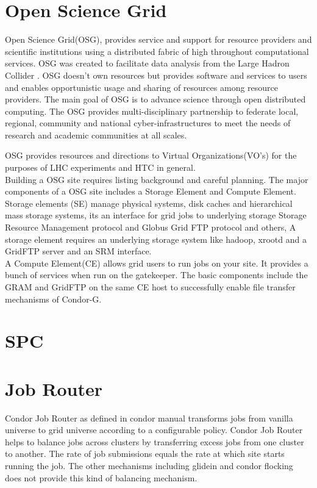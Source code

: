 \documentclass[ms,electronic,double]{nuthesis}
\begin{document}
\section{Open Science Grid} Open Science Grid(OSG), provides service and support 
for resource providers and scientific institutions using a distributed fabric of 
high throughout computational services. OSG was created to facilitate data analysis from the 
Large Hadron Collider . OSG doesn't own resources but provides software and services to 
users and enables opportunistic usage and sharing of resources among resource providers.
The main goal of OSG is to advance science through open distributed computing. 
The OSG provides multi-disciplinary partnership to federate local, regional, community and 
national cyber-infrastructures to meet the needs of research and academic communities at all scales.

OSG provides resources and directions to Virtual Organizations(VO's) for the purposes of LHC experiments
and HTC in general. \\

Building a OSG site requires listing background and careful planning. The major 
components of a OSG site includes a Storage Element and Compute Element. \\

Storage elements (SE) manage physical systems, disk caches and hierarchical mass storage 
systems, its an interface for grid jobs to underlying storage Storage Resource Management protocol and Globus 
Grid FTP protocol and others, A storage element requires an underlying storage system like hadoop, xrootd
and a GridFTP server and an SRM interface.\\

A Compute Element(CE) allows grid users to run jobs on your site. It provides a 
bunch of services when run on the gatekeeper. The basic components include 
the GRAM and GridFTP on the same CE host to successfully enable file transfer 
mechanisms of Condor-G.\\

\section{SPC}

\section{Job Router}
Condor Job Router as defined in condor manual\cite{manual56} transforms jobs from vanilla 
universe to grid universe according to a configurable policy.   Condor Job 
Router helps to balance jobs across clusters by transferring excess jobs from 
one cluster to another.  The rate of job submissions equals the rate at which 
site starts running the job. The other mechanisms including glidein and condor 
flocking does not provide this kind of balancing mechanism.
\end{document}
